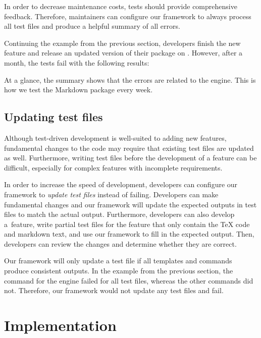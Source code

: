 \documentclass[final]{ltugboat}
\begin{document}
In order to decrease maintenance costs, tests should provide comprehensive feedback. Therefore, maintainers can configure our framework to always process all test files and produce a helpful summary of all errors.

Continuing the example from the previous section, developers finish the new feature and release an updated version of their package on . However, after a month, the tests fail with the following results:

\smallskip
\noindent
\begingroup
\centering

\par
\endgroup

\smallskip
\noindent
At a glance, the summary shows that the errors are related to the  engine. This is how we test the Markdown package every week.

\subsection{Updating test files}
\label{sec:updating-test-files}

Although test-driven development is well-suited to adding new features, fundamental changes to the code may require that existing test files are updated as well. Furthermore, writing test files before the development of a feature can be difficult, especially for complex features with incomplete requirements.

In order to increase the speed of development, developers can configure our framework to \emph{update test files} instead of failing. Developers can make fundamental changes and our framework will update the expected outputs in test files to match the actual output. Furthermore, developers can also develop a~feature, write partial test files for the feature that only contain the \TeX{} code and markdown text, and use our framework to fill in the expected output. Then, developers can review the changes and determine whether they are correct.

Our framework will only update a test file if all templates and commands produce consistent outputs. In the example from the previous section, the command for the  engine failed for all test files, whereas the other commands did not. Therefore, our framework would not update any test files and fail.

\section{Implementation}
\label{sec:implementation}
\end{document}
